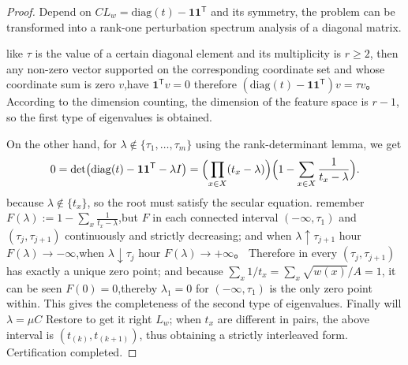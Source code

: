 \begin{proof}
Depend on \(CL_w=\mathrm{diag}(t)-\mathbf 1\mathbf 1^{\mathsf T}\) and its symmetry, the problem can be transformed into a rank-one perturbation spectrum analysis of a diagonal matrix.
\par
like \(\tau\) is the value of a certain diagonal element and its multiplicity is \(r\ge 2\), then any non-zero vector supported on the corresponding coordinate set and whose coordinate sum is zero \(v\),have \(\mathbf 1^{\mathsf T}v=0\) therefore \((\mathrm{diag}(t)-\mathbf 1\mathbf 1^{\mathsf T})v=\tau v\)。
According to the dimension counting, the dimension of the feature space is \(r-1\), so the first type of eigenvalues ​​is obtained.
\par
On the other hand, for \(\lambda\notin\{\tau_1,\dots,\tau_m\}\) using the rank-determinant lemma, we get
\[
0=\det\bigl(\mathrm{diag}(t)-\mathbf 1\mathbf 1^{\mathsf T}-\lambda I\bigr)
=\Bigl(\prod_{x\in X}(t_x-\lambda)\Bigr)\Bigl(1-\sum_{x\in X}\frac{1}{t_x-\lambda}\Bigr).
\]
because \(\lambda\notin\{t_x\}\), so the root must satisfy the secular equation.
remember \(F(\lambda):=1-\sum_x\frac{1}{t_x-\lambda}\),but \(F\) in each connected interval \((-\infty,\tau_1)\) and \((\tau_j,\tau_{j+1})\) continuously and strictly decreasing;
and when \(\lambda\uparrow\tau_{j+1}\) hour \(F(\lambda)\to-\infty\),when \(\lambda\downarrow\tau_j\) hour \(F(\lambda)\to+\infty\)。
Therefore in every \((\tau_j,\tau_{j+1})\) has exactly a unique zero point; and because
\(
\sum_x 1/t_x=\sum_x\sqrt{w(x)}/A=1
\), it can be seen \(F(0)=0\),thereby \(\lambda_1=0\) for \((-\infty,\tau_1)\) is the only zero point within.
This gives the completeness of the second type of eigenvalues.
Finally will \(\lambda=\mu C\) Restore to get it right \(L_w\); when \(t_x\) are different in pairs, the above interval is \((t_{(k)},t_{(k+1)})\), thus obtaining a strictly interleaved form. Certification completed.
\end{proof}



